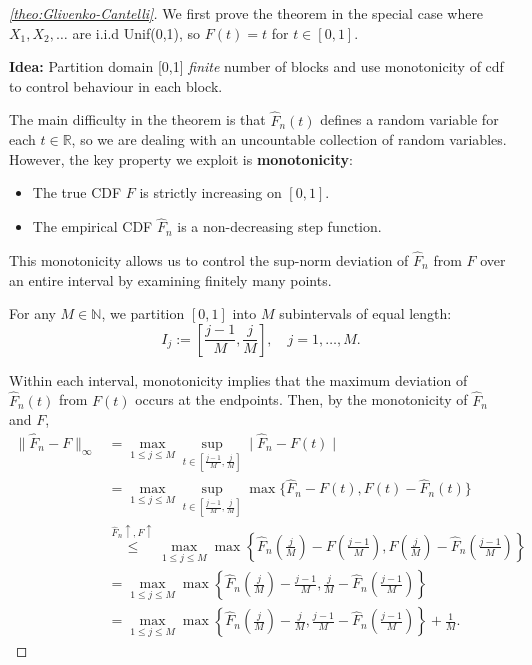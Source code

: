 \begin{proof}[\autoref{theo:Glivenko-Cantelli}]
    We first prove the theorem in the special case where \(X_1,X_2,\dots \) are i.i.d Unif(0,1), so \(F(t) = t\) for \(t \in [0,1]\).    

    \textbf{Idea:} Partition domain [0,1] \emph{finite} number of blocks and use monotonicity of cdf to control behaviour in each block.

The main difficulty in the theorem is that $\hat F_n(t)$ defines a random variable for 
each $t \in \mathbb{R}$, so we are dealing with an uncountable collection of random variables. 
However, the key property we exploit is \textbf{monotonicity}:
\begin{itemize}
    \item The true CDF $F$ is strictly increasing on $[0,1]$.
    \item The empirical CDF $\hat F_n$ is a non-decreasing step function.
\end{itemize}
This monotonicity allows us to control the sup-norm deviation of $\hat F_n$ from $F$ over 
an entire interval by examining finitely many points.

For any \(M \in \mathbb{N}\), we partition \([0,1]\) into \(M\) subintervals of equal length:
\[
I_j := \left[ \frac{j-1}{M}, \frac{j}{M} \right], \quad j=1,\dots,M.
\]

Within each interval, monotonicity implies that the maximum deviation of $\hat F_n(t)$ 
from $F(t)$ occurs at the endpoints. 
Then, by the monotonicity of \(\hat{F}_{n}\) and \(F\),
    \begin{align*}
        \|\hat{F}_{n}-F\|_{\infty} &= 
        \max\limits_{1\le j\le M} \sup\limits_{t \in \left[ \frac{j-1}{M},\frac{j}{M} \right] } \mid \hat{F}_{n}-F(t)\mid \\
                                   &=\max\limits_{1\le j\le M} \sup\limits_{t \in \left[ \frac{j-1}{M},\frac{j}{M} \right] } \max\{ \hat{F}_{n}-F(t), F(t) - \hat{F}_{n}(t)\} \\
                                   & \overset{\hat{F}_{n}\uparrow,F\uparrow}{\le } \max\limits_{1\le j\le M} \max \left\{ \hat{F}_{n}\left( \frac{j}{M} \right) -F \left( \frac{j-1}{M} \right) , F\left( \frac{j}{M}  \right) - \hat{F}_{n} \left( \frac{j-1}{M} \right)  \right\} 
                                   \\&= \max\limits_{1\le j\le M} \max \left\{ \hat{F}_{n}\left( \frac{j}{M} \right) -\frac{j-1}{M} ,\frac{j}{M}  - \hat{F}_{n} \left( \frac{j-1}{M} \right)  \right\} 
                                   \\&= \max\limits_{1\le j\le M} \max \left\{ \hat{F}_{n}\left( \frac{j}{M} \right) -\frac{j}{M} ,\frac{j-1}{M}  - \hat{F}_{n} \left( \frac{j-1}{M} \right)  \right\} + \frac{1}{M}.
    \end{align*}


\end{proof}

